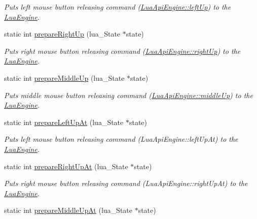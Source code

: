 \begin{DoxyCompactItemize}
\begin{DoxyCompactList}\small\item\em Puts left mouse button releasing command (\hyperlink{class_lua_api_engine_a926f72169c400bb32186737f03208e1c}{Lua\-Api\-Engine\-::left\-Up}) to the \hyperlink{class_lua_engine}{Lua\-Engine}. \end{DoxyCompactList}\item 
static int \hyperlink{class_lua_api_engine_a6777e46c87e999bd66c4ae349a9078cf}{prepare\-Right\-Up} (lua\-\_\-\-State $\ast$state)
\begin{DoxyCompactList}\small\item\em Puts right mouse button releasing command (\hyperlink{class_lua_api_engine_ae8b09733792cc95ca22654be8074bfbf}{Lua\-Api\-Engine\-::right\-Up}) to the \hyperlink{class_lua_engine}{Lua\-Engine}. \end{DoxyCompactList}\item 
static int \hyperlink{class_lua_api_engine_a846fe811b326260da13425a8b9b6f908}{prepare\-Middle\-Up} (lua\-\_\-\-State $\ast$state)
\begin{DoxyCompactList}\small\item\em Puts middle mouse button releasing command (\hyperlink{class_lua_api_engine_a2cd4a53a99e262aa9d5e83a2b34b6538}{Lua\-Api\-Engine\-::middle\-Up}) to the \hyperlink{class_lua_engine}{Lua\-Engine}. \end{DoxyCompactList}\item 
static int \hyperlink{class_lua_api_engine_a6e63e8131106f5e01d445a564e6569f5}{prepare\-Left\-Up\-At} (lua\-\_\-\-State $\ast$state)
\begin{DoxyCompactList}\small\item\em Puts left mouse button releasing command (Lua\-Api\-Engine\-::left\-Up\-At) to the \hyperlink{class_lua_engine}{Lua\-Engine}. \end{DoxyCompactList}\item 
static int \hyperlink{class_lua_api_engine_a63574f6087f18f635b1df170d51391a6}{prepare\-Right\-Up\-At} (lua\-\_\-\-State $\ast$state)
\begin{DoxyCompactList}\small\item\em Puts right mouse button releasing command (Lua\-Api\-Engine\-::right\-Up\-At) to the \hyperlink{class_lua_engine}{Lua\-Engine}. \end{DoxyCompactList}\item 
static int \hyperlink{class_lua_api_engine_aba8972c05819c262e4a9d8dec53b7e8f}{prepare\-Middle\-Up\-At} (lua\-\_\-\-State $\ast$state)

\end{DoxyCompactItemize}
